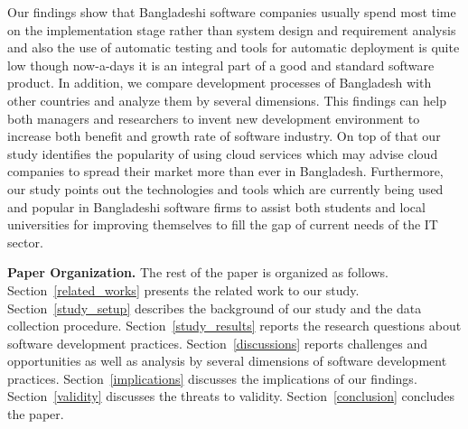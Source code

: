 Our findings show that Bangladeshi software companies usually spend most time on the implementation stage rather than system design and requirement analysis and also the use of automatic testing and tools for automatic deployment is quite low though now-a-days it is an integral part of a good and standard software product. In addition, we compare development processes of Bangladesh with other countries and analyze them by several dimensions. This findings can help both managers and researchers to invent new development environment to increase both benefit and growth rate of software industry. On top of that our study identifies the popularity of using cloud services which may advise cloud companies to spread their market more than ever in Bangladesh. Furthermore, our study points out the technologies and tools which are currently being used and popular in Bangladeshi software firms to assist both students and local universities for improving themselves to fill the gap of current needs of the IT sector.

\noindent\textbf{Paper Organization.} The rest of the paper is organized as follows. Section~\ref{related_works} presents the related work to our study. Section~\ref{study_setup} describes the background of our study and the data collection procedure. Section~\ref{study_results} reports the research questions about software development practices. Section~\ref{discussions} reports challenges and opportunities as well as analysis by several dimensions of software development practices. Section~\ref{implications} discusses the implications of our findings. Section~\ref{validity} discusses the threats to validity. Section~\ref{conclusion} concludes the paper.
